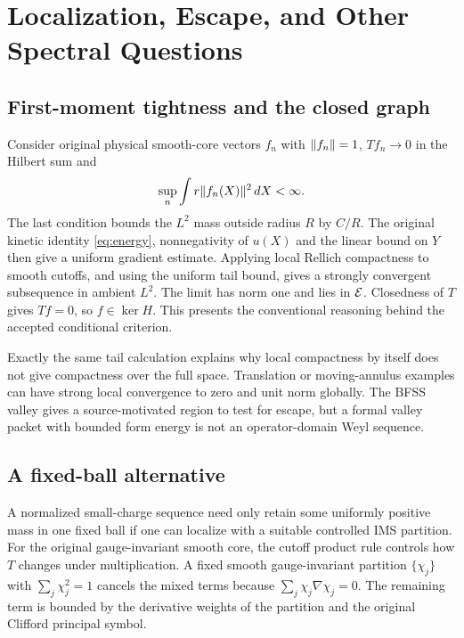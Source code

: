 \chapter{Localization, Escape, and Other Spectral Questions}\label{ch:local}

\section{First-moment tightness and the closed graph}
Consider original physical smooth-core vectors $f_n$ with $\lVert f_n\rVert=1$, $Tf_n\to0$ in the Hilbert sum and
\[
 \sup_n\int r\lVert f_n(X)\rVert^2\,dX<\infty .
\]
The last condition bounds the $L^2$ mass outside radius $R$ by $C/R$. The original kinetic identity \eqref{eq:energy}, nonnegativity of $u(X)$ and the linear bound on $Y$ then give a uniform gradient estimate. Applying local Rellich compactness to smooth cutoffs, and using the uniform tail bound, gives a strongly convergent subsequence in ambient $L^2$. The limit has norm one and lies in $\mathcal E$. Closedness of $T$ gives $Tf=0$, so $f\in\ker H$. This presents the conventional reasoning behind the accepted conditional criterion.

Exactly the same tail calculation explains why local compactness by itself does not give compactness over the full space. Translation or moving-annulus examples can have strong local convergence to zero and unit norm globally. The BFSS valley gives a source-motivated region to test for escape, but a formal valley packet with bounded form energy is not an operator-domain Weyl sequence.

\section{A fixed-ball alternative}
A normalized small-charge sequence need only retain some uniformly positive mass in one fixed ball if one can localize with a suitable controlled IMS partition. For the original gauge-invariant smooth core, the cutoff product rule controls how $T$ changes under multiplication. A fixed smooth gauge-invariant partition $\{\chi_j\}$ with $\sum_j\chi_j^2=1$ cancels the mixed terms because $\sum_j\chi_j\nabla\chi_j=0$. The remaining term is bounded by the derivative weights of the partition and the original Clifford principal symbol.

